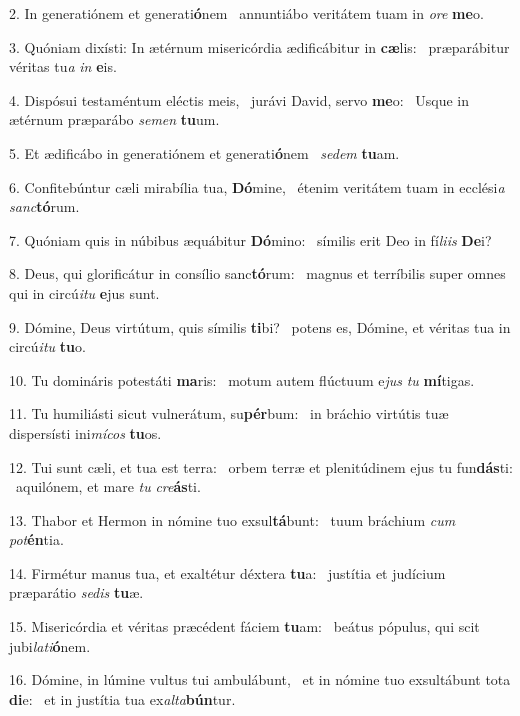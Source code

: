 2. In generatiónem et generati\textbf{ó}nem \ast\  annuntiábo veritátem tuam in \textit{o}\textit{re} \textbf{me}o.\

3. Quóniam dixísti: In ætérnum misericórdia ædificábitur in \textbf{cæ}lis: \ast\  præparábitur véritas tu\textit{a} \textit{in} \textbf{e}is.\

4. Dispósui testaméntum eléctis meis, \dag\  jurávi David, servo \textbf{me}o: \ast\  Usque in ætérnum præparábo \textit{se}\textit{men} \textbf{tu}um.\

5. Et ædificábo in generatiónem et generati\textbf{ó}nem \ast\  \textit{se}\textit{dem} \textbf{tu}am.\

6. Confitebúntur cæli mirabília tua, \textbf{Dó}mine, \ast\  étenim veritátem tuam in ecclési\textit{a} \textit{sanc}\textbf{tó}rum.\

7. Quóniam quis in núbibus æquábitur \textbf{Dó}mino: \ast\  símilis erit Deo in fí\textit{li}\textit{is} \textbf{De}i?\

8. Deus, qui glorificátur in consílio sanc\textbf{tó}rum: \ast\  magnus et terríbilis super omnes qui in circú\textit{i}\textit{tu} \textbf{e}jus sunt.\

9. Dómine, Deus virtútum, quis símilis \textbf{ti}bi? \ast\  potens es, Dómine, et véritas tua in circú\textit{i}\textit{tu} \textbf{tu}o.\

10. Tu domináris potestáti \textbf{ma}ris: \ast\  motum autem flúctuum e\textit{jus} \textit{tu} \textbf{mí}tigas.\

11. Tu humiliásti sicut vulnerátum, su\textbf{pér}bum: \ast\  in bráchio virtútis tuæ dispersísti ini\textit{mí}\textit{cos} \textbf{tu}os.\

12. Tui sunt cæli, et tua est terra: \dag\  orbem terræ et plenitúdinem ejus tu fun\textbf{dás}ti: \ast\  aquilónem, et mare \textit{tu} \textit{cre}\textbf{ás}ti.\

13. Thabor et Hermon in nómine tuo exsul\textbf{tá}bunt: \ast\  tuum bráchium \textit{cum} \textit{pot}\textbf{én}tia.\

14. Firmétur manus tua, et exaltétur déxtera \textbf{tu}a: \ast\  justítia et judícium præparátio \textit{se}\textit{dis} \textbf{tu}æ.\

15. Misericórdia et véritas præcédent fáciem \textbf{tu}am: \ast\  beátus pópulus, qui scit jubi\textit{la}\textit{ti}\textbf{ó}nem.\

16. Dómine, in lúmine vultus tui ambulábunt, \dag\  et in nómine tuo exsultábunt tota \textbf{di}e: \ast\  et in justítia tua ex\textit{al}\textit{ta}\textbf{bún}tur.\

